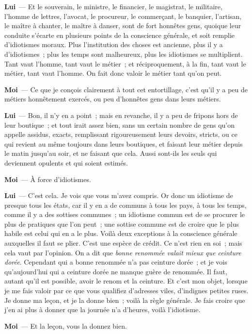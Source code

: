\documentclass[french,twoside]{book} %
\newcommand{\labelchar}[1]{\textbf{\color{rubric} #1}}
\begin{document}
\labelchar{Lui} — Et le souverain, le ministre, le financier, le magistrat, le militaire, l’homme de lettres, l’avocat, le procureur, le commerçant, le banquier, l’artisan, le maître à chanter, le maître à danser, sont de fort honnêtes gens, quoique leur conduite s’écarte en plusieurs points de la conscience générale, et soit remplie d’idiotismes moraux. Plus l’institution des choses est ancienne, plus il y a d’idiotismes ; plus les temps sont malheureux, plus les idiotismes se multiplient. Tant vaut l’homme, tant vaut le métier ; et réciproquement, à la fin, tant vaut le métier, tant vaut l’homme. On fait donc valoir le métier tant qu’on peut.\par
\labelchar{Moi} — Ce que je conçois clairement à tout cet entortillage, c’est qu’il y a peu de métiers honnêtement exercés, ou peu d’honnêtes gens dans leurs métiers.\par
\labelchar{Lui} — Bon, il n’y en a point ; mais en revanche, il y a peu de fripons hors de leur boutique ; et tout irait assez bien, sans un certain nombre de gens qu’on appelle assidus, exacts, remplissant rigoureusement leurs devoirs, stricts, ou ce qui revient au même toujours dans leurs boutiques, et faisant leur métier depuis le matin jusqu’au soir, et ne faisant que cela. Aussi sont-ils les seuls qui deviennent opulents et qui soient estimés.\par
\labelchar{Moi} — À force d’idiotismes.\par
\labelchar{Lui} — C’est cela. Je vois que vous m’avez compris. Or donc un idiotisme de presque tous les états, car il y en a de communs à tous les pays, à tous les temps, comme il y a des sottises communes ; un idiotisme commun est de se procurer le plus de pratiques que l’on peut ; une sottise commune est de croire que le plus habile est celui qui en a le plus. Voilà deux exceptions à la conscience générale auxquelles il faut se plier. C’est une espèce de crédit. Ce n’est rien en soi ; mais cela vaut par l’opinion. On a dit que \emph{bonne renommée valait mieux que ceinture dorée}. Cependant qui a bonne renommée n’a pas ceinture dorée ; et je vois qu’aujourd’hui qui a ceinture dorée ne manque guère de renommée. Il faut, autant qu’il est possible, avoir le renom et la ceinture. Et c’est mon objet, lorsque je me fais valoir par ce que vous qualifiez d’adresses viles, d’indignes petites ruses. Je donne ma leçon, et je la donne bien ; voilà la règle générale. Je fais croire que j’en ai plus à donner que la journée n’a d’heures, voilà l’idiotisme.\par
\labelchar{Moi} — Et la leçon, vous la donnez bien.\par
\end{document}
